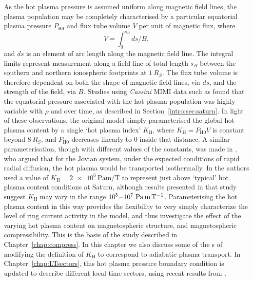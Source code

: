 As the hot plasma pressure is assumed uniform along magnetic field lines, the plasma population may be completely characterised by a particular equatorial plasma pressure $P_\mathrm{H0}$ and flux tube volume $V$ per unit of magnetic flux, where
\begin{equation}\label{intro:eq:ftv}
V = \int_{0}^{s_{B}} ds/B,
\end{equation}
and $ds$ is an element of arc length along the magnetic field line. The integral limits represent measurement along a field line of total length $s_B$ between the southern and northern ionospheric footprints at $\SI{1}{R_S}$. The flux tube volume is therefore dependent on both the shape of magnetic field lines, via $ds$, and the strength of the field, via $B$. Studies using \textit{Cassini} MIMI data such as \citet{sergis2007} found that the equatorial pressure associated with the hot plasma population was highly variable with $\rho$ and over time, as described in Section~\ref{intro:sec:saturn}. In light of these observations, the original \citet{achilleos2010a} model simply parameterised the global hot plasma content by a single `hot plasma index' $K_\mathrm{H}$, where $ K_\mathrm{H}= P_\mathrm{H0}V$ is constant beyond $\SI{8}{R_S}$, and $P_\mathrm{H0}$ decreases linearly to 0 inside that distance. A similar parameterisation, though with different values of the constants, was made in \citet{caudal1986}, who argued that for the Jovian system, under the expected conditions of rapid radial diffusion, the hot plasma would be transported isothermally. In \citet{achilleos2010a} the authors used a value of $K_\mathrm{H} = \SI{2e6}{\pascal\meter\per\tesla}$ to represent just above `typical' hot plasma content conditions at Saturn, although results presented in that study suggest $K_\mathrm{H}$ may vary in the range $10^5{\--}10^7~\si{\pascal\meter\per\tesla}$. Parameterising the hot plasma content in this way provides the flexibility to very simply characterize the level of ring current activity in the model, and thus investigate the effect of the varying hot plasma content on magnetospheric structure, and magnetospheric compressibility. This is the basis of the study described in Chapter~\ref{chap:compress}. In this chapter we also discuss some of the s of modifying the definition of $K_\mathrm{H}$ to correspond to adiabatic plasma transport. In Chapter~\ref{chap:LTsectors}, this hot plasma pressure boundary condition is updated to describe different local time sectors, using recent results from \citet{sergis2017}.

